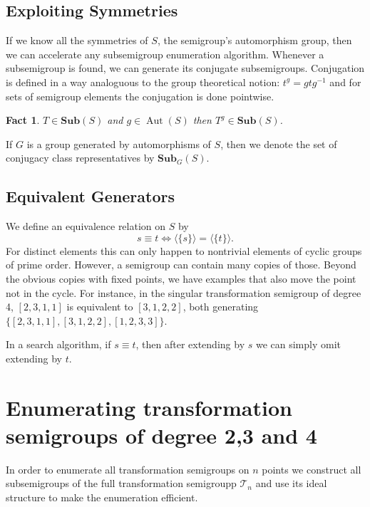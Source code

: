 \documentclass{amsart}
\newcommand{\cT}{{\mathcal T}}
\newcommand{\Sub}{\mathbf{Sub}}
\DeclareMathOperator{\Aut}{Aut}
\theoremstyle{plain}
\newtheorem{fact}[theorem]{Fact}
\theoremstyle{definition}
\begin{document}
\subsection{Exploiting Symmetries}
If we know all the symmetries of $S$, the semigroup's automorphism group, then we can accelerate any subsemigroup enumeration algorithm.
Whenever a subsemigroup is found, we can generate its conjugate subsemigroups.
Conjugation is defined in a way analoguous to the group theoretical notion: $t^g=gtg^{-1}$ and for sets of semigroup elements the conjugation is done pointwise.
 
\begin{fact}
$T\in\Sub(S)$ and $g\in \Aut(S)$ then $T^g\in\Sub(S)$.%
\end{fact}

If $G$ is a group generated by automorphisms of $S$, then we denote the set of conjugacy class representatives by $\Sub_G(S)$.


\subsection{Equivalent Generators}
\label{sec:equivgen}
We define an equivalence relation on $S$ by
$$ s\equiv t \Longleftrightarrow \langle\{s\} \rangle= \langle\{t\} \rangle.$$
For distinct elements this can only happen to nontrivial elements of cyclic groups of prime order.
However, a semigroup can contain many copies of those.
Beyond the obvious copies with fixed points, we have examples that also move the point not in the cycle. For instance, in the singular transformation semigroup of degree 4, $[ 2, 3, 1, 1 ]$ is equivalent to  $[ 3, 1, 2, 2 ]$, both generating $\{ [ 2, 3, 1, 1 ], [ 3, 1, 2, 2 ], [ 1, 2, 3, 3 ]\}$.

In a search algorithm, if $s\equiv t$, then after extending by $s$ we can simply omit extending by $t$.

\section{Enumerating transformation semigroups of degree 2,3 and 4}
\label{sec:fulltranssgp}

In order to enumerate all transformation semigroups on $n$ points we construct all subsemigroups of the full transformation semigroupp $\cT_n$ and use its ideal structure to make the enumeration efficient.
\end{document}
